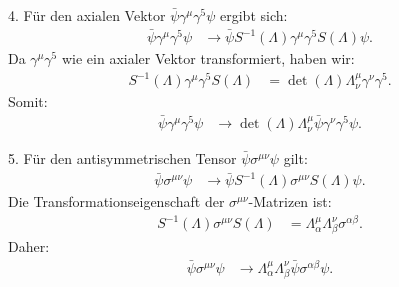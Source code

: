 4. Für den axialen Vektor \(\bar{\psi} \gamma^\mu \gamma^5 \psi\) ergibt sich:
\begin{align*}
\bar{\psi} \gamma^\mu \gamma^5 \psi &\rightarrow \bar{\psi} S^{-1}(\Lambda) \gamma^\mu \gamma^5 S(\Lambda) \psi.
\end{align*}
Da \(\gamma^\mu \gamma^5\) wie ein axialer Vektor transformiert, haben wir:
\begin{align*}
S^{-1}(\Lambda) \gamma^\mu \gamma^5 S(\Lambda) &= \operatorname{det}(\Lambda) \Lambda_\nu^\mu \gamma^\nu \gamma^5.
\end{align*}
Somit:
\begin{align*}
\bar{\psi} \gamma^\mu \gamma^5 \psi &\rightarrow \operatorname{det}(\Lambda) \Lambda_\nu^\mu \bar{\psi} \gamma^\nu \gamma^5 \psi.
\end{align*}

5. Für den antisymmetrischen Tensor \(\bar{\psi} \sigma^{\mu \nu} \psi\) gilt:
\begin{align*}
\bar{\psi} \sigma^{\mu \nu} \psi &\rightarrow \bar{\psi} S^{-1}(\Lambda) \sigma^{\mu \nu} S(\Lambda) \psi.
\end{align*}
Die Transformationseigenschaft der \(\sigma^{\mu \nu}\)-Matrizen ist:
\begin{align*}
S^{-1}(\Lambda) \sigma^{\mu \nu} S(\Lambda) &= \Lambda_\alpha^\mu \Lambda_\beta^\nu \sigma^{\alpha \beta}.
\end{align*}
Daher:
\begin{align*}
\bar{\psi} \sigma^{\mu \nu} \psi &\rightarrow \Lambda_\alpha^\mu \Lambda_\beta^\nu \bar{\psi} \sigma^{\alpha \beta} \psi.
\end{align*}

